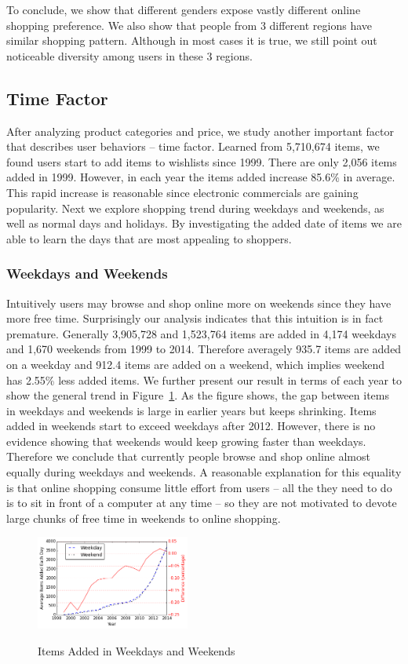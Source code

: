 To conclude, we show that different genders expose vastly different online shopping preference. We also show that people from 3 different regions have similar shopping pattern. Although in most cases it is true, we still point out noticeable diversity among users in these 3 regions. 

\subsection{Time Factor}
After analyzing product categories and price, we study another important factor that describes user behaviors -- time factor. Learned from 5,710,674 items, we found users start to add items to wishlists since 1999. There are only 2,056 items added in 1999. However, in each year the items added increase 85.6\% in average. This rapid increase is reasonable since electronic commercials are gaining popularity. Next we explore shopping trend during weekdays and weekends, as well as normal days and holidays. By investigating the added date of items we are able to learn the days that are most appealing to shoppers.

\subsubsection{Weekdays and Weekends}
Intuitively users may browse and shop online more on weekends since they have more free time. Surprisingly our analysis indicates that this intuition is in fact premature. Generally 3,905,728 and 1,523,764 items are added in 4,174 weekdays and 1,670 weekends from 1999 to 2014. Therefore averagely 935.7 items are added on a weekday and 912.4 items are added on a weekend, which implies weekend has 2.55\% less added items. We further present our result in terms of each year to show the general trend in Figure~\ref{fig:week}. As the figure shows, the gap between items in weekdays and weekends is large in earlier years but keeps shrinking. Items added in weekends start to exceed weekdays after 2012. However, there is no evidence showing that weekends would keep growing faster than weekdays. Therefore we conclude that currently people browse and shop online almost equally during weekdays and weekends. A reasonable explanation for this equality is that online shopping consume little effort from users -- all the they need to do is to sit in front of a computer at any time -- so they are not motivated to devote large chunks of free time in weekends to online shopping.

\begin{figure}[t]
\centering
  \caption{Items Added in Weekdays and Weekends}{}
  \label{fig:week}
  \centering
    \includegraphics[width=0.45\textwidth]{weekday.png}
\end{figure}

